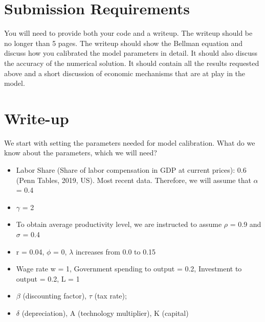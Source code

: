 \documentclass{article}
\begin{document}
\section*{Submission Requirements}
You will need to provide both your code and a writeup. The writeup should be no longer than 5 pages. The writeup should show the Bellman equation and discuss how you calibrated the model parameters in detail. It should also discuss the accuracy of the numerical solution. It should contain all the results requested above and a short discussion of economic mechanisms that are at play in the model.

\section*{Write-up}

We start with setting the parameters needed for model calibration. 
What do we know about the parameters, which we will need?
\begin{itemize}
    \item  Labor Share (Share of labor compensation in GDP at current prices): 0.6 (Penn Tables, 2019, US). Most recent data. Therefore, we will assume that \(\alpha\) = 0.4\
    \item \(\gamma\) =  2\
    \item To obtain average productivity level, we are instructed to assume \(\rho\) = 0.9 and \(\sigma\) = 0.4
    \item r = 0.04, \(\phi\) = 0, \(\lambda\) increases from 0.0 to 0.15
    \item Wage rate w = 1, Government spending to output = 0.2, Investment to output = 0.2, L = 1
    \item \(\beta\)  (discounting factor), \(\tau\) (tax rate); 
    \item \(\delta\) (depreciation),  A (technology multiplier), K (capital) 
\end{itemize}
\end{document}
